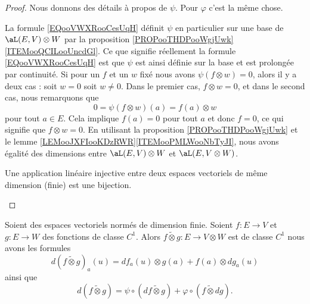 \begin{proof}
	Nous donnons des détails à propos de \( \psi\). Pour \( \varphi\) c'est la même chose.
	\begin{subproof}
		\spitem[Linéaire]
		La formule \eqref{EQooVWXRooCesUqH} définit \( \psi\) en particulier sur une base de \( \aL(E,V)\otimes W\) par la proposition \ref{PROPooTHDPooWgjUwk}\ref{ITEMooQCILooUncdGl}. Ce que signifie réellement la formule \eqref{EQooVWXRooCesUqH} est que \( \psi\) est ainsi définie sur la base et est prolongée par continuité.
		\spitem[Injective]
		Si pour un \( f\) et un \( w\) fixé nous avons \( \psi(f\otimes w)=0\), alors il y a deux cas : soit \( w=0\) soit \( w\neq0\). Dans le premier cas, \( f\otimes w=0\), et dans le second cas, nous remarquons que
		\begin{equation}
			0=\psi(f\otimes w)(a)=f(a)\otimes w
		\end{equation}
		pour tout \( a\in E\). Cela implique \( f(a)=0\) pour tout \( a\) et donc \( f=0\), ce qui signifie que \( f\otimes w=0\).
		\spitem[Bijective]
		En utilisant la proposition \ref{PROPooTHDPooWgjUwk} et le lemme \ref{LEMooJXFIooKDzRWR}\ref{ITEMooPMLWooNbTyJI}, nous avons égalité des dimensions entre \( \aL(E,V)\otimes W\) et \( \aL(E,V\otimes W)\).

		Une application linéaire injective entre deux espaces vectoriels de même dimension (finie) est une bijection.
	\end{subproof}
\end{proof}

\begin{proposition}     \label{PROPooZOAFooRMeBgI}
	Soient des espaces vectoriels normés de dimension finie. Soient \( f\colon E\to V\) et \( g\colon E\to W\) des fonctions de classe \( C^1\). Alors \( f\tilde\otimes g\colon E\to V\otimes W\) est de classe \( C^1\) nous avons les formules
	\begin{equation}        \label{EQooSUSCooBhZXFC}
		d(f\tilde\otimes g)_a(u)=df_a(u)\otimes g(a)+f(a)\otimes dg_a(u)
	\end{equation}
	ainsi que
	\begin{equation}        \label{EQooOCEEooUrsIDd}
		d(f\tilde\otimes g)=\psi\circ(df\tilde\otimes g)+\varphi\circ(f\tilde\otimes dg).
	\end{equation}
\end{proposition}

